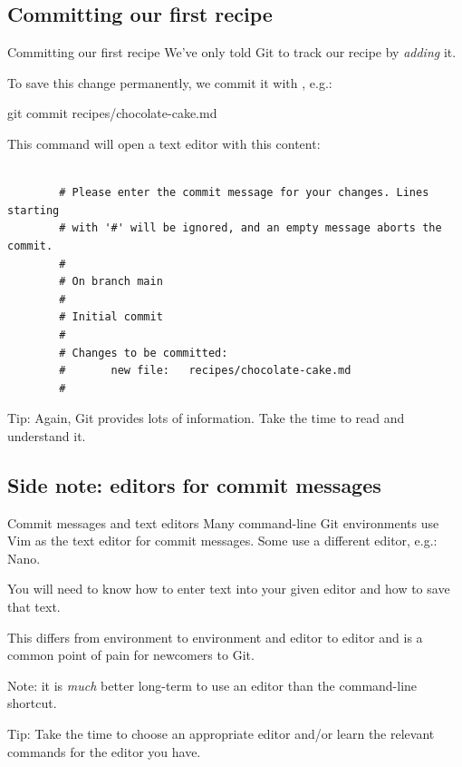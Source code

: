 \documentclass{git_course}
\begin{document}
\subsection{Committing our first recipe}

\begin{frame}[fragile]{Committing our first recipe}
    We've only told Git to track our recipe by \emph{adding} it.

    To save this change permanently, we commit it with ,
    e.g.:

    \begin{shellcode}
        git commit recipes/chocolate-cake.md
    \end{shellcode}

    This command will open a text editor with this content:
    \begin{verbatim}

        # Please enter the commit message for your changes. Lines starting
        # with '#' will be ignored, and an empty message aborts the commit.
        #
        # On branch main
        #
        # Initial commit
        #
        # Changes to be committed:
        #       new file:   recipes/chocolate-cake.md
        #
    \end{verbatim}

     Tip: Again, Git provides lots of information.  Take the
    time to read and understand it.
\end{frame}

\subsection{Side note: editors for commit messages}

\begin{frame}[fragile]{Commit messages and text editors}
    Many command-line Git environments use Vim as the text editor for commit
    messages.  Some use a different editor, e.g.: Nano.

    You will need to know how to enter text into your given editor and how
    to save that text.

    This differs from environment to environment and editor to editor and is
    a common point of pain for newcomers to Git.

    Note: it is \emph{much} better long-term to use an editor than the
     command-line shortcut.

     Tip: Take the time to choose an appropriate
    editor and/or learn the relevant commands for the editor you have.
\end{frame}
\end{document}
